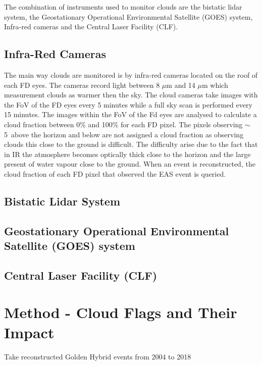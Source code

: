 The combination of instruments used to monitor clouds are the bistatic lidar system, the Geostationary Operational Environmental Satellite (GOES) system, Infra-red cameras and the Central Laser Facility (CLF).

\subsection{Infra-Red Cameras}

The main way clouds are monitored is by infra-red cameras located on the roof of each FD eyes. The cameras record light between 8 $\mu$m and 14 $\mu$m which measurement clouds as warmer then the sky. The cloud cameras take images with the FoV of the FD eyes every 5 minutes while a full sky scan is performed every 15 minutes. The images within the FoV of the Fd eyes are analysed to calculate a cloud fraction between 0\% and 100\% for each FD pixel. The pixels observing $\sim$ 5\textdegree \ above the horizon and below are not assigned a cloud fraction as observing clouds this close to the ground is difficult. The difficulty arise due to the fact that in IR the atmosphere becomes optically thick close to the horizon and the large present of water vapour close to the ground. When an event is reconstructed, the cloud fraction of each FD pixel that observed the EAS event is queried.
 
\subsection{Bistatic Lidar System}



\subsection{Geostationary Operational Environmental Satellite (GOES) system}

\subsection{Central Laser Facility (CLF)}



\section{Method - Cloud Flags and Their Impact}

Take reconstructed Golden Hybrid events from 2004 to 2018 

